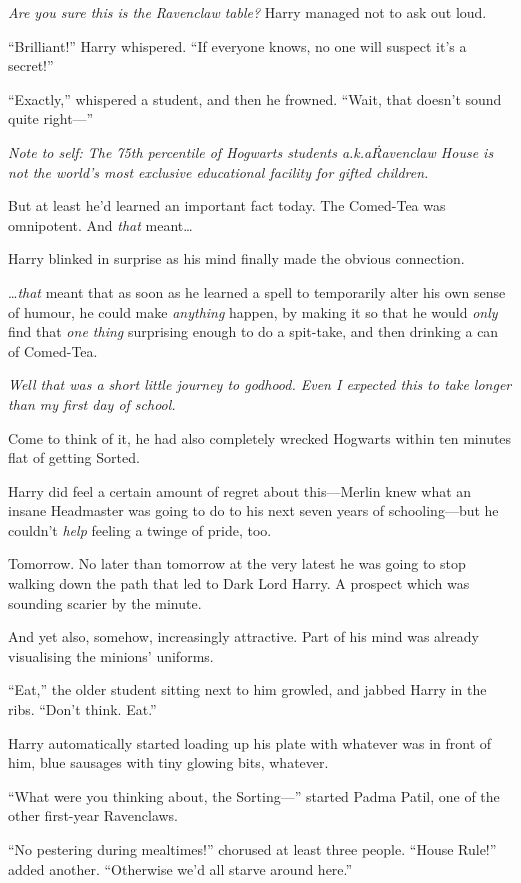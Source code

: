 \emph{Are you sure this is the Ravenclaw table?} Harry managed not to ask out loud.

“Brilliant!” Harry whispered. “If everyone knows, no one will suspect it’s a secret!”

“Exactly,” whispered a student, and then he frowned. “Wait, that doesn’t sound quite right—”

\emph{Note to self: The 75th percentile of Hogwarts students a.k.a\. Ravenclaw House is not the world’s most exclusive educational facility for gifted children.}

But at least he’d learned an important fact today. The Comed-Tea was omnipotent. And \emph{that} meant…

Harry blinked in surprise as his mind finally made the obvious connection.

…\emph{that} meant that as soon as he learned a spell to temporarily alter his own sense of humour, he could make \emph{anything} happen, by making it so that he would \emph{only} find that \emph{one thing} surprising enough to do a spit-take, and then drinking a can of Comed-Tea.

\emph{Well that was a short little journey to godhood. Even I expected this to take longer than my first day of school.}

Come to think of it, he had also completely wrecked Hogwarts within ten minutes flat of getting Sorted.

Harry did feel a certain amount of regret about this—Merlin knew what an insane Headmaster was going to do to his next seven years of schooling—but he couldn’t \emph{help} feeling a twinge of pride, too.

Tomorrow. No later than tomorrow at the very latest he was going to stop walking down the path that led to Dark Lord Harry. A prospect which was sounding scarier by the minute.

And yet also, somehow, increasingly attractive. Part of his mind was already visualising the minions’ uniforms.

“Eat,” the older student sitting next to him growled, and jabbed Harry in the ribs. “Don’t think. Eat.”

Harry automatically started loading up his plate with whatever was in front of him, blue sausages with tiny glowing bits, whatever.

“What were you thinking about, the Sorting—” started Padma Patil, one of the other first-year Ravenclaws.

“No pestering during mealtimes!” chorused at least three people. “House Rule!” added another. “Otherwise we’d all starve around here.”

